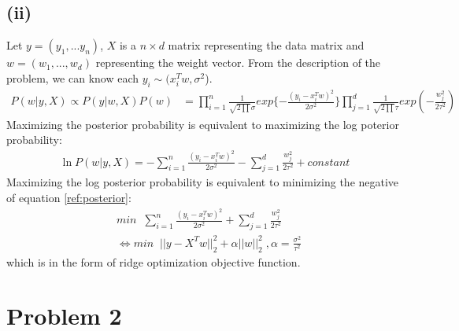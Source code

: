 \documentclass[]{homework}
\begin{document}
\subsection*{(ii)} Let $y= (y_1, ...y_n)$, $X$ is a $n \times d$ matrix representing the data matrix and $w=(w_1,...,w_d)$ representing the weight vector. From the description of the problem, we can know each $y_i \sim (x_i^T w, \sigma ^2$).
\begin{equation}
\begin{aligned}
P(w|y,X) \propto P(y|w,X)P(w) &= \prod_{i=1}^{n} \frac{1}{\sqrt{2\prod} \sigma} exp{\{-\frac{(y_i-x_i^Tw)^2}{2\sigma^2}\}}\prod_{j=1}^{d} \frac{1}{\sqrt{2\prod}\tau}exp(-\frac{w_j^2}{2\tau^2})
\end{aligned}
\end{equation}
Maximizing the posterior probability is equivalent to maximizing the log poterior probability:
\begin{equation}
\begin{aligned}
\label{ref:posterior}
\ln P(w|y,X) = -\sum_{i=1}^{n} \frac{(y_i-x_i^Tw)^2}{2\sigma^2} - \sum_{j=1}^{d} \frac{w_j^2}{2\tau^2} + constant
\end{aligned}
\end{equation}
Maximizing the log posterior probability is equivalent to minimizing the negative of equation \ref{ref:posterior}:
\begin{equation}
\begin{aligned}
&min\;\;\sum_{i=1}^{n} \frac{(y_i-x_i^Tw)^2}{2\sigma^2} + \sum_{j=1}^{d} \frac{w_j^2}{2\tau^2} \\
&\iff min\;\;||y-X^Tw||_2^2 + \alpha ||w||_2^2\;,\alpha = \frac{\sigma^2}{\tau^2}
\end{aligned}
\end{equation}
which is in the form of ridge optimization objective function.
\section*{Problem 2}
\end{document}
